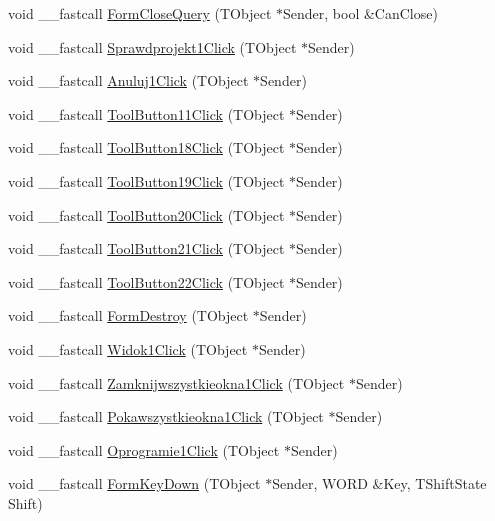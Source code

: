 \begin{CompactItemize}
\item 
void \_\-\_\-fastcall \hyperlink{classTForm1_f3fc2edfe6864f1204a491d88a160202}{FormCloseQuery} (TObject $\ast$Sender, bool \&CanClose)
\item 
void \_\-\_\-fastcall \hyperlink{classTForm1_285e94be246f0e0b2b04885d45ad5a77}{Sprawdprojekt1Click} (TObject $\ast$Sender)
\item 
void \_\-\_\-fastcall \hyperlink{classTForm1_0aebc36097cbddf910fe57cd0a2afa35}{Anuluj1Click} (TObject $\ast$Sender)
\item 
void \_\-\_\-fastcall \hyperlink{classTForm1_a171e9a7877c477410034b7e10ed9843}{ToolButton11Click} (TObject $\ast$Sender)
\item 
void \_\-\_\-fastcall \hyperlink{classTForm1_f9b33b7f20eeb63d7de3f5334db5e538}{ToolButton18Click} (TObject $\ast$Sender)
\item 
void \_\-\_\-fastcall \hyperlink{classTForm1_b8f8eeee515fd162462380c9a0eb450e}{ToolButton19Click} (TObject $\ast$Sender)
\item 
void \_\-\_\-fastcall \hyperlink{classTForm1_ed5b7aeb13679cc44c7fa9fd3f3a0eff}{ToolButton20Click} (TObject $\ast$Sender)
\item 
void \_\-\_\-fastcall \hyperlink{classTForm1_b91cedf9d878aadab926009fdd6880fe}{ToolButton21Click} (TObject $\ast$Sender)
\item 
void \_\-\_\-fastcall \hyperlink{classTForm1_378f04e87d819886bcb3e20aa47ab90a}{ToolButton22Click} (TObject $\ast$Sender)
\item 
void \_\-\_\-fastcall \hyperlink{classTForm1_f8af464cefaf41db4e61e56f3066638c}{FormDestroy} (TObject $\ast$Sender)
\item 
void \_\-\_\-fastcall \hyperlink{classTForm1_1c822362efe786992cc566620f2364ae}{Widok1Click} (TObject $\ast$Sender)
\item 
void \_\-\_\-fastcall \hyperlink{classTForm1_6fad014f2d10de311b9205f7aa47f93f}{Zamknijwszystkieokna1Click} (TObject $\ast$Sender)
\item 
void \_\-\_\-fastcall \hyperlink{classTForm1_f6a2b0b43deb2c48726155f268204529}{Pokawszystkieokna1Click} (TObject $\ast$Sender)
\item 
void \_\-\_\-fastcall \hyperlink{classTForm1_c392ee503212147cd1ad1b424ca75552}{Oprogramie1Click} (TObject $\ast$Sender)
\item 
void \_\-\_\-fastcall \hyperlink{classTForm1_5c7d023f63fa47e531de3634725067f6}{FormKeyDown} (TObject $\ast$Sender, WORD \&Key, TShiftState Shift)
\item 

\end{CompactItemize}
